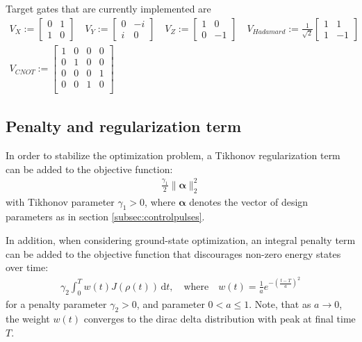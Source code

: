 \documentclass[letterpaper]{article}
\begin{document}
Target gates that are currently implemented are
\begin{align}
  V_{X} := \begin{bmatrix} 0 & 1 \\ 1 & 0  \end{bmatrix} \quad
  V_{Y} := \begin{bmatrix} 0 & -i \\ i & 0 \end{bmatrix} \quad
  V_{Z} := \begin{bmatrix} 1 & 0 \\ 0 & -1 \end{bmatrix} \quad 
  V_{Hadamard} := \frac{1}{\sqrt{2}} 
           \begin{bmatrix} 1 & 1 \\ 1 & -1 \end{bmatrix} \\
  V_{CNOT} := \begin{bmatrix} 1  & 0 & 0 & 0 \\ 
                               0  & 1 & 0 & 0 \\ 
                               0  & 0 & 0 & 1 \\ 
                               0  & 0 & 1 & 0 \\ 
                \end{bmatrix}
\end{align}

\subsection{Penalty and regularization term}
In order to stabilize the optimization problem, a Tikhonov regularization term can be added to the objective function:
\begin{align}
 \frac{\gamma_1}{2} \| \boldsymbol{\alpha} \|^2_2
\end{align}
with Tikhonov parameter $\gamma_1 > 0$, where $\boldsymbol{\alpha}$ denotes the vector of design parameters as in section \ref{subsec:controlpulses}.


In addition, when considering ground-state optimization, an integral penalty term can be added to the objective function that discourages non-zero energy states over time:
\begin{align}
  \gamma_2 \int_0^T w(t) J(\rho(t)) \, \mathrm{d}t, \quad \text{where} \quad w(t) =
  \frac{1}{a} e^{ -\left(\frac{t-T}{a} \right)^2}
\end{align}
for a penalty parameter $\gamma_2 > 0$, and parameter $0 < a \leq 1$. Note, that as $a\to 0$, the weight $w(t)$ converges to the dirac delta
distribution with peak at final time $T$. 
\end{document}
